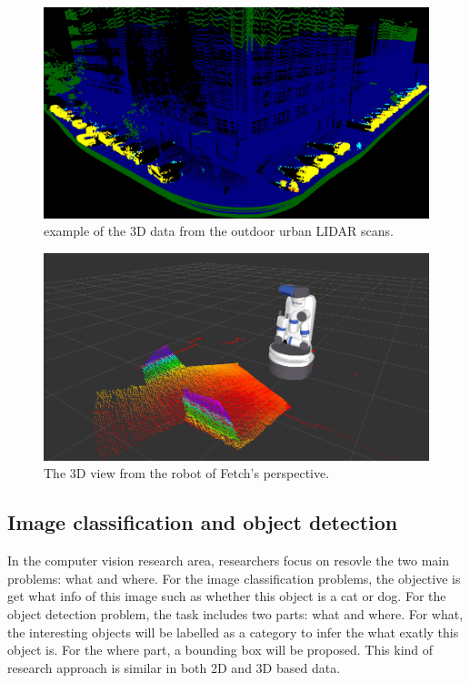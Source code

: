 \documentclass[a4paper,12pt]{article}
\begin{document}
 
 
 \begin{figure}[H]
  \begin{center}
      \includegraphics[scale=0.25]{cnn.jpg}
\end{center}
\caption{example of the 3D data from the outdoor urban LIDAR scans\cite{allancnn}.}
 \label{fig:lidar}
 \end{figure}
 
  \begin{figure}[H]
  \begin{center}
      \includegraphics[scale=0.4]{rviz.png}
\end{center}
\caption{The 3D view from the robot of Fetch's perspective.}
 \label{fig:fetch}
 \end{figure}
 
 
 
 
 
 
 

\subsection{Image classification and object detection}
In the computer vision research area, researchers focus on resovle the two main problems: what and where. For the image classification problems, the objective is get what info of this image such as whether this object is a cat or dog. For the object detection problem, the task includes two parts: what and where. For what, the interesting objects will be labelled as a category to infer the what exatly this object is. For the where part, a bounding box will be proposed. This kind of research approach is similar in both 2D and 3D based data.
\end{document}
